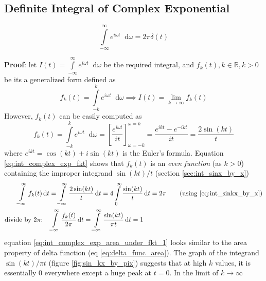 \documentclass[11pt, a4paper]{article}
\newcommand{\eqrefnp}[1]{\textup{\ref{#1}}}  %
\newcommand{\diff}{\mathop{}\!\mathrm{d}}
\newcommand{\dt}{\diff t}
\newcommand{\domega}{\diff \omega}
\newcommand{\dint}[2]{\int \limits_{#1}^{#2}}  %
\newcommand{\intinfty}{\dint{-\infty}{\infty}}	%
\newcommand{\intzerotoinfty}{\dint{0}{\infty}}	%
\begin{document}
	\subsection{Definite Integral of Complex Exponential}\label{sec:int_complex_exp}
	\begin{equation}\label{eq:int_complex_exp}
		\intinfty e^{i\omega t} \domega = 2\pi \delta (t)
	\end{equation}
	
	\vspace{4pt}
	\textbf{Proof}: \cite{herman2016fourieranalysis} let $I(t) = \intinfty e^{i\omega t} \domega$ be the required integral, and $f_{k}(t), k\in \mathbb{R}, k > 0$ be its a generalized form defined as
	\begin{equation}\label{eq:int_complex_exp_It_as_fkt}
		f_{k}(t) = \dint{-k}{k} e^{i\omega t} \domega \implies I(t) = \lim\limits_{k \to \infty} f_{k}(t)
	\end{equation}
	However, $f_{k}(t)$ can be easily computed as
	\begin{equation}\label{eq:int_complex_exp_fkt}
		f_{k}(t) = \dint{-k}{k} e^{i\omega t} \domega = \left[\frac{e^{i\omega t}}{it}\right]_{\omega=-k}^{\omega=k} = \frac{e^{ikt} - e^{-ikt}}{it} = \frac{2\sin(kt)}{t}
	\end{equation}
	where $e^{ikt}=\cos(kt) + i\sin(kt)$ is the Euler's formula. Equation \eqref{eq:int_complex_exp_fkt} shows that $f_{k}(t)$ is an \textit{even function} (as $k > 0$) containing the improper integrand $\sin(kt)/t$ (section \ref{sec:int_sinx_by_x})
	\begin{align}
		\intinfty f_{k}(t) \dt & = \intinfty \frac{2\sin(kt)}{t} \dt = 4 \intzerotoinfty \frac{\sin(kt)}{t} \dt = 2\pi	\tag{using \eqrefnp{eq:int_sinkx_by_x}} \nonumber \\
		\text{divide by $2\pi$:} \quad & \intinfty \frac{f_{k}(t)}{2\pi} \dt = \intinfty \frac{\sin(kt)}{\pi t} \dt = 1 \label{eq:int_complex_exp_area_under_fkt_1}
	\end{align}
	equation \eqref{eq:int_complex_exp_area_under_fkt_1} looks similar to the area property of delta function (eq \eqrefnp{eq:delta_func_area}). The graph of the integrand $\sin(kt)/\pi t$ (figure \ref{fig:sin_kx_by_pix}) suggests that at high $k$ values, it is essentially $0$ everywhere except a huge peak at $t=0$. In the limit of $k \to \infty$
\end{document}
